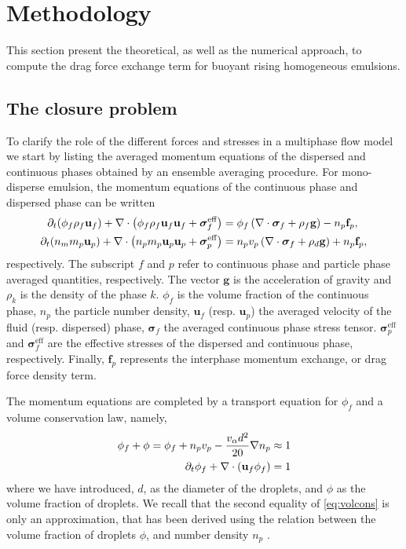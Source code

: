 \section{Methodology}
\label{sec:methodology_drag}
This section present the theoretical, as well as the numerical approach, to compute the drag force exchange term for buoyant rising homogeneous emulsions.

\subsection{The closure problem}
To clarify the role of the different forces and stresses in a multiphase flow model we start by listing the averaged momentum equations of the dispersed and continuous phases obtained by an ensemble averaging procedure.
For mono-disperse emulsion, the momentum equations of the continuous phase and dispersed phase can be written \citep{zhang1997momentum,jackson1997locally}
\begin{align}
    \pddt (\phi_f\rho_f \textbf{u}_f)
    + \div \left(\phi_f\rho_f \textbf{u}_f\textbf{u}_f + \bm{\sigma}_f^{\text{eff}}\right)
    &= \phi_f 
    \left(\div \bm{\sigma}_f
    + \rho_f \textbf{g}\right)
    - n_p \textbf{f}_p, 
    \label{eq:dt_uf}
    \\
    \pddt (n_m  m_p  \textbf{u}_p)
    + \div \left(n_p m_p  \textbf{u}_p\textbf{u}_p
    +  \bm{\sigma}_p^{\text{eff}}\right)
    &= 
    n_p v_p \left(\div \bm{\sigma}_f
    + \rho_d \textbf{g}\right)
    + n_p \textbf{f}_p, 
    \label{eq:dt_up}
\end{align}
respectively. 
The subscript $f$ and $p$ refer to continuous phase and particle phase averaged quantities, respectively.
The vector $\textbf{g}$ is the acceleration of gravity and $\rho_k$ is the density of the phase $k$. 
$\phi_f$ is the volume fraction of the continuous phase, $n_p$ the particle number density, $\textbf{u}_f$ (resp. $\textbf{u}_p$) the averaged velocity of the fluid (resp. dispersed) phase, $\bm{\sigma}_f$ the averaged continuous phase stress tensor.
$\bm{\sigma}^{\text{eff}}_p$ and $\bm{\sigma}^{\text{eff}}_f$ are the effective stresses of the dispersed and continuous phase, respectively.  
Finally, $\textbf{f}_p$ represents the interphase momentum exchange, or drag force density term. 

The momentum equations are completed by a transport equation for $\phi_f$ and a volume conservation law, namely, 
\begin{align}
    \label{eq:volcons}
    \phi_f+\phi= \phi_f + n_pv_p  - \frac{v_\alpha d^2 }{20}\grad n_p \approx 1\\
    \pddt \phi_f + \div (\textbf{u}_f \phi_f)= 1
\end{align}
where we have introduced, $d$, as the diameter of the droplets, and $\phi$ as the volume fraction of droplets. 
We recall that the second equality of \ref{eq:volcons} is only an approximation, that has been derived using the relation between the volume fraction of droplets $\phi$, and number density $n_p$ \citep{zhang1997momentum}. 

